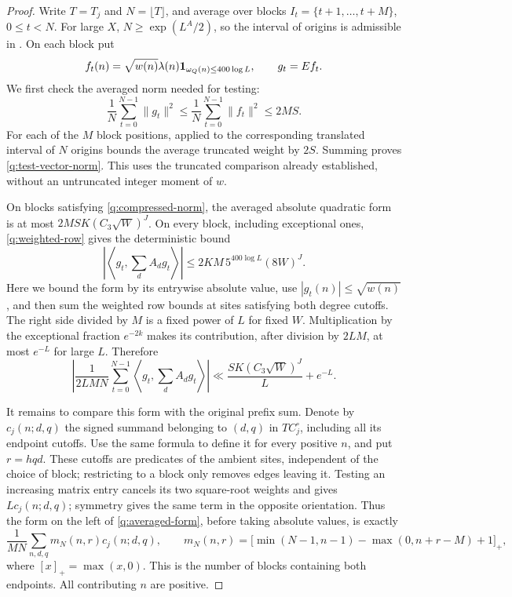 \begin{proof}
Write $T=T_j$ and $N=\lfloor T\rfloor$, and average over blocks
$I_t=\{t+1,\ldots,t+M\}$, $0\le t<N$. For large $X$,
$N\ge\exp(L^A/2)$, so the interval of origins is admissible in
. On each block put
\[
 f_t(n)=\sqrt{w(n)}\lambda(n)
             \mathbf 1_{\omega_Q(n)\le400\log L},\qquad g_t=Ef_t.
\]
We first check the averaged norm needed for testing:
\begin{equation}\label{q:test-vector-norm}
 \frac1N\sum_{t=0}^{N-1}\|g_t\|^2
 \le\frac1N\sum_{t=0}^{N-1}\|f_t\|^2\le2MS.
\end{equation}
For each of the $M$ block positions, 
applied to the corresponding translated interval of $N$ origins
bounds the average truncated weight by $2S$. Summing proves
\eqref{q:test-vector-norm}. This uses the truncated comparison
already established, without an untruncated integer moment of $w$.

On blocks satisfying \eqref{q:compressed-norm}, the averaged absolute
quadratic form is at most $2MSK(C_3\sqrt W)^J$. On every block,
including exceptional ones, \eqref{q:weighted-row} gives the
deterministic bound
\begin{equation}\label{q:deterministic-test}
 \left|\left\langle g_t,\sum_d A_d g_t\right\rangle\right|
 \le 2KM\,5^{400\log L}(8W)^J.
\end{equation}
Here we bound the form by its entrywise absolute value, use
$|g_t(n)|\le\sqrt{w(n)}$, and then sum the weighted row bounds at
sites satisfying both degree cutoffs. The right side divided by $M$
is a fixed power of $L$ for fixed $W$. Multiplication by the exceptional
fraction $e^{-2k}$ makes its contribution, after division by $2LM$,
at most $e^{-L}$ for large $L$. Therefore
\begin{equation}\label{q:averaged-form}
 \left|\frac1{2LMN}\sum_{t=0}^{N-1}
       \left\langle g_t,\sum_d A_d g_t\right\rangle\right|
 \ll \frac{S K(C_3\sqrt W)^J}{L}+e^{-L}.
\end{equation}

It remains to compare this form with the original prefix sum. Denote
by $c_j(n;d,q)$ the signed summand belonging to $(d,q)$ in
$T C_j^\circ$, including all its endpoint cutoffs. Use the same
formula to define it for every positive $n$, and put $r=hqd$. These cutoffs
are predicates of the ambient sites, independent of the choice of
block; restricting to a block only removes edges leaving it.
Testing an increasing matrix entry cancels its two square-root
weights and gives $L c_j(n;d,q)$; symmetry gives the same term in the
opposite orientation. Thus the form on the left of
\eqref{q:averaged-form}, before taking absolute values, is exactly
\begin{equation}\label{q:edge-multiplicity}
 \frac1{MN}\sum_{n,d,q}m_N(n,r)c_j(n;d,q),\qquad
 m_N(n,r)=
 \bigl[\min(N-1,n-1)-\max(0,n+r-M)+1\bigr]_+,
\end{equation}
where $[x]_+=\max(x,0)$. This is the number of blocks containing both
endpoints. All contributing $n$ are positive.


\end{proof}
